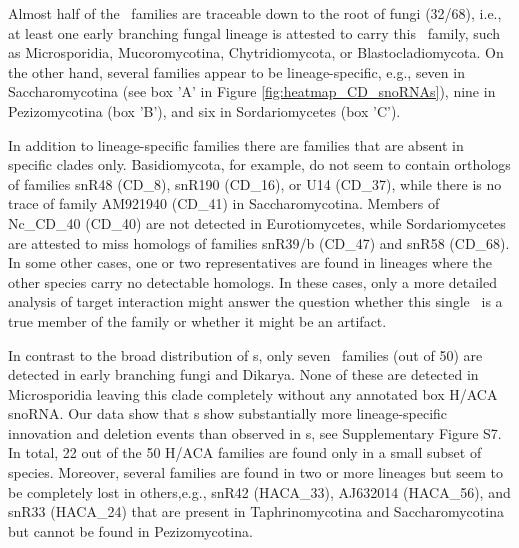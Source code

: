 Almost half of the \cd\ families are traceable down to the root of fungi
(32/68), i.e., at least one early branching fungal lineage is attested to
carry this \sno\ family, such as Microsporidia, Mucoromycotina,
Chytridiomycota, or Blastocladiomycota. On the other hand, several families
appear to be lineage-specific, e.g., seven in Saccharomycotina (see box 'A'
in Figure \ref{fig:heatmap_CD_snoRNAs}), nine in Pezizomycotina (box 'B'),
and six in Sordariomycetes (box 'C').

In addition to lineage-specific families there are families that
  are absent in specific clades only. Basidiomycota, for example, do not
seem to contain orthologs of families snR48 (CD\_8), snR190 (CD\_16), or
U14 (CD\_37), while there is no trace of family AM921940 (CD\_41) in
Saccharomycotina. Members of Nc\_CD\_40 (CD\_40) are not detected in
Eurotiomycetes, while Sordariomycetes are attested to miss homologs of
families snR39/b (CD\_47) and snR58 (CD\_68). In some other cases, one or
two representatives are found in lineages where the other species carry no
detectable homologs. In these cases, only a more detailed analysis of
target interaction might answer the question whether this single \sno\ is a
true member of the family or whether it might be an artifact.

In contrast to the broad distribution of \cd s, only seven \haca\
families (out of 50) are detected in early branching fungi and
Dikarya. None of these are detected in Microsporidia leaving this
clade completely without any annotated box H/ACA snoRNA. Our data show
that \haca s show substantially more lineage-specific innovation and
deletion events than observed in \cd s, see Supplementary Figure
S7. In total, 22 out of the 50 H/ACA families are found only in a
small subset of species. Moreover, several families are found in two
or more lineages but seem to be completely lost in others,e.g.,
snR42 (HACA\_33), AJ632014 (HACA\_56), and snR33 (HACA\_24) that are
present in Taphrinomycotina and Saccharomycotina but cannot be found
in Pezizomycotina.


